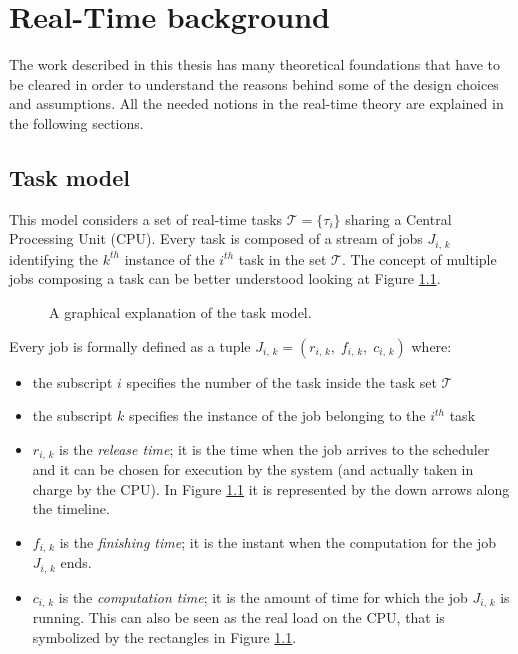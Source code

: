 \chapter{Real-Time background} \label{cha:rt_background}

The work described in this thesis has many theoretical foundations that have to be
cleared in order to understand the reasons behind some of the design choices and
assumptions. All the needed notions in the real-time theory are explained in the
following sections.


\section{Task model} \label{sec:task_model}
This model considers a set of real-time tasks \( \mathcal{T} = \{\tau_{i}\} \)
sharing a Central Processing Unit (CPU). Every task
is composed of a stream of jobs \( J_{i,\,k} \) identifying the \( k^{th} \)
instance of the \( i^{th} \) task in the set \( \mathcal{T} \). The concept of multiple
jobs composing a task can be better understood looking at Figure \ref{img:task_model}.
\begin{figure}[!htb]
    \caption{A graphical explanation of the task model.}
    \label{img:task_model}
\end{figure}

Every job is formally defined as a tuple
\( J_{i,\,k} = \left(r_{i,\,k}, \;f_{i,\,k}, \;c_{i,\,k}\right) \) where:
\begin{itemize}
    \item the subscript \( i \) specifies the number of the task inside the task 
        set \( \mathcal{T} \)
    \item the subscript \( k \) specifies the instance of the job belonging to
        the \( i^{th} \) task
    \item \( r_{i,\,k} \) is the \emph{release time}; it is the time when
        the job arrives to the scheduler and it can be chosen for execution
        by the system (and actually taken in charge by the CPU). In Figure
        \ref{img:task_model} it is represented by the down arrows along the
        timeline.
    \item \( f_{i,\,k} \) is the \emph{finishing time}; it is the instant when
        the computation for the job \( J_{i,\,k} \) ends.
    \item \( c_{i,\,k} \) is the \emph{computation time}; it is the amount of
        time for which the job \( J_{i,\,k} \) is running. This can also be seen
        as the real load on the CPU, that is symbolized by the rectangles
        in Figure \ref{img:task_model}.
\end{itemize} 

